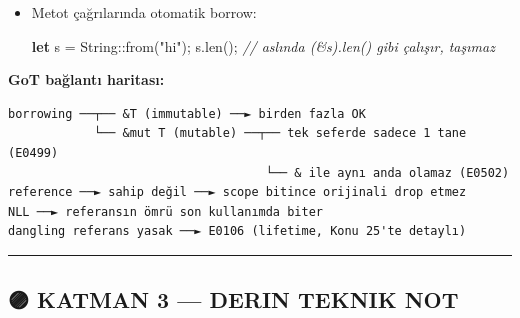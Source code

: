 \documentclass[12pt,a4paper]{article}
\newenvironment{Shaded}{}{}
\newcommand{\CommentTok}[1]{\textcolor[rgb]{0.38,0.63,0.69}{\textit{#1}}}
\newcommand{\DataTypeTok}[1]{\textcolor[rgb]{0.56,0.13,0.00}{#1}}
\newcommand{\FunctionTok}[1]{\textcolor[rgb]{0.02,0.16,0.49}{#1}}
\newcommand{\KeywordTok}[1]{\textcolor[rgb]{0.00,0.44,0.13}{\textbf{#1}}}
\newcommand{\NormalTok}[1]{#1}
\newcommand{\OperatorTok}[1]{\textcolor[rgb]{0.40,0.40,0.40}{#1}}
\newcommand{\StringTok}[1]{\textcolor[rgb]{0.25,0.44,0.63}{#1}}
\begin{document}
\begin{itemize}
\begin{Shaded}
\begin{Highlighting}[]
\KeywordTok{fn} \FunctionTok{dangle}\OperatorTok{()} \OperatorTok{-\textgreater{}} \OperatorTok{\&}\DataTypeTok{String} \OperatorTok{\{}      \CommentTok{// E0106: missing lifetime specifier}
    \KeywordTok{let}\NormalTok{ s }\OperatorTok{=} \DataTypeTok{String}\OperatorTok{::}\FunctionTok{from}\OperatorTok{(}\StringTok{"x"}\OperatorTok{);}
    \OperatorTok{\&}\NormalTok{s}
\OperatorTok{\}}                              \CommentTok{// s burada drop edilir, referans sarkık kalırdı}
\end{Highlighting}
\end{Shaded}


  Çözüm: \texttt{String}`i doğrudan döndür (ownership transfer), referans değil
\item
  Metot çağrılarında otomatik borrow:

\begin{Shaded}
\begin{Highlighting}[]
\KeywordTok{let}\NormalTok{ s }\OperatorTok{=} \DataTypeTok{String}\OperatorTok{::}\FunctionTok{from}\OperatorTok{(}\StringTok{"hi"}\OperatorTok{);}
\NormalTok{s}\OperatorTok{.}\FunctionTok{len}\OperatorTok{();}            \CommentTok{// aslında (\&s).len() gibi çalışır, taşımaz}
\end{Highlighting}
\end{Shaded}
\end{itemize}

\textbf{GoT bağlantı haritası:}

\begin{verbatim}
borrowing ──┬── &T (immutable) ──► birden fazla OK
            └── &mut T (mutable) ──┬── tek seferde sadece 1 tane (E0499)
                                    └── & ile aynı anda olamaz (E0502)
reference ──► sahip değil ──► scope bitince orijinali drop etmez
NLL ──► referansın ömrü son kullanımda biter
dangling referans yasak ──► E0106 (lifetime, Konu 25'te detaylı)
\end{verbatim}

\begin{center}\rule{0.5\linewidth}{0.5pt}\end{center}

\subsection{🟣 KATMAN 3 --- DERIN TEKNIK NOT}\label{katman-3-—-derin-teknik-not-11}
\end{document}
